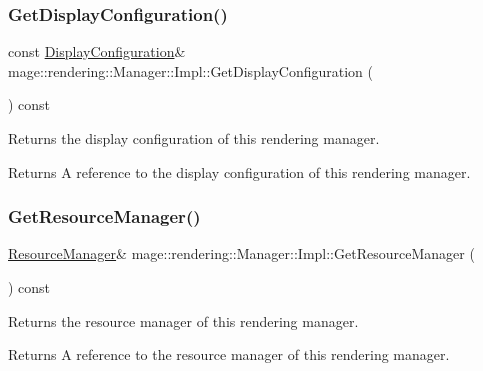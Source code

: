 \subsubsection{\texorpdfstring{Get\+Display\+Configuration()}{GetDisplayConfiguration()}}
{\footnotesize\ttfamily const \mbox{\hyperlink{classmage_1_1rendering_1_1_display_configuration}{Display\+Configuration}}\& mage\+::rendering\+::\+Manager\+::\+Impl\+::\+Get\+Display\+Configuration (\begin{DoxyParamCaption}{ }\end{DoxyParamCaption}) const\hspace{0.3cm}{\ttfamily [noexcept]}}

Returns the display configuration of this rendering manager.

\begin{DoxyReturn}{Returns}
A reference to the display configuration of this rendering manager. 
\end{DoxyReturn}
\mbox{\label{classmage_1_1rendering_1_1_manager_1_1_impl_a604da1cb1bf3eb9783320ee1366c43a4}} 
\subsubsection{\texorpdfstring{Get\+Resource\+Manager()}{GetResourceManager()}}
{\footnotesize\ttfamily \mbox{\hyperlink{classmage_1_1rendering_1_1_resource_manager}{Resource\+Manager}}\& mage\+::rendering\+::\+Manager\+::\+Impl\+::\+Get\+Resource\+Manager (\begin{DoxyParamCaption}{ }\end{DoxyParamCaption}) const\hspace{0.3cm}{\ttfamily [noexcept]}}

Returns the resource manager of this rendering manager.

\begin{DoxyReturn}{Returns}
A reference to the resource manager of this rendering manager. 
\end{DoxyReturn}
\mbox{\label{classmage_1_1rendering_1_1_manager_1_1_impl_aa2f6c98780d9e035ae1eb3822e5e3810}} 
